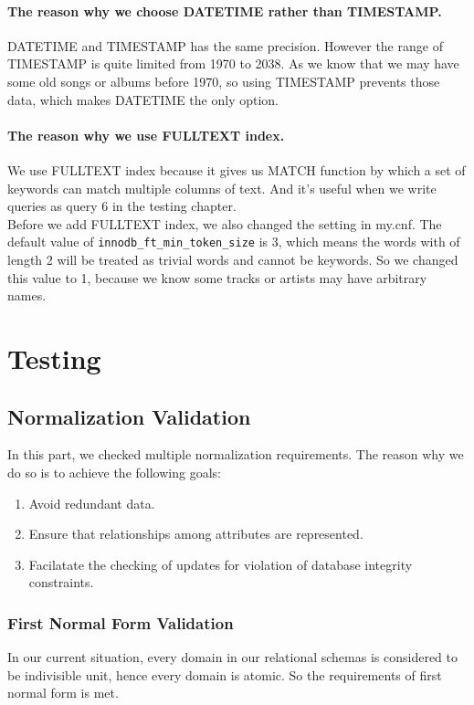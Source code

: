\documentclass[letterpaper, 12pt]{report}
\begin{document}
	\subsubsection{The reason why we choose DATETIME rather than TIMESTAMP.}
	DATETIME and TIMESTAMP has the same precision. However the range of TIMESTAMP is quite limited from 1970 to 2038. As we know that we may have some old songs or albums before 1970, so using TIMESTAMP prevents those data, which makes DATETIME the only option.
	
	\subsubsection{The reason why we use FULLTEXT index.}
	We use FULLTEXT index because it gives us MATCH function by which a set of keywords can match multiple columns of text. And it's useful when we write queries as query 6 in the testing chapter.\\
	Before we add FULLTEXT index, we also changed the setting in my.cnf. The default value of \texttt{innodb\_ft\_min\_token\_size} is 3, which means the words with of length 2 will be treated as trivial words and cannot be keywords. So we changed this value to 1, because we know some tracks or artists may have arbitrary names.\\
	\chapter{Testing}
	
	\section{Normalization Validation}
	In this part, we checked multiple normalization requirements. The reason why we do so is to achieve the following goals:
	\begin{enumerate}
		\item 
		Avoid redundant data.
		\item 
		Ensure that relationships among attributes are represented.
		\item 
		Facilatate the checking of updates for violation of database integrity constraints.
	\end{enumerate}
	\subsection{First Normal Form Validation}
	In our current situation, every domain in our relational schemas is considered to be indivisible unit, hence every domain is atomic. So the requirements of first normal form is met.
\end{document}
